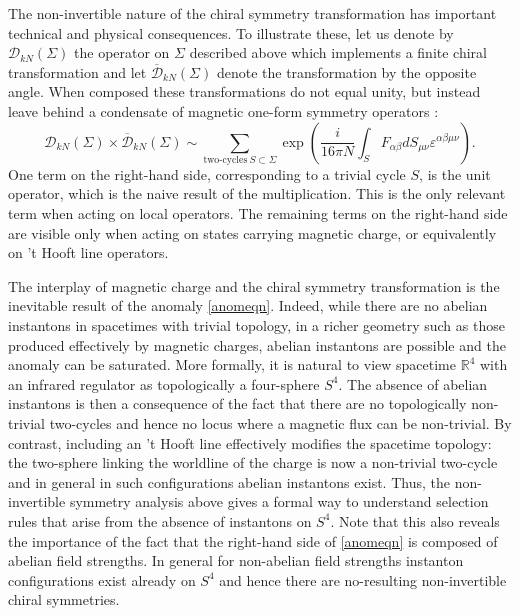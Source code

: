 \documentclass[11pt,a4paper]{article}
\begin{document}
The non-invertible nature of the chiral symmetry transformation has important technical and physical consequences.  To illustrate these, let us denote by $\mathcal{D}_{kN}(\Sigma)$ the operator on $\Sigma$ described above which implements a finite chiral transformation and let $\overline{\mathcal{D}}_{kN}(\Sigma)$ denote the transformation by the opposite angle.  When composed these transformations do not equal unity, but instead leave behind a condensate of magnetic one-form symmetry operators \cite{Choi:2021kmx, Kaidi:2021xfk,Roumpedakis:2022aik,Choi:2022jqy, Cordova:2022ieu}:
\begin{equation}\label{fusion}
    \mathcal{D}_{kN}(\Sigma)\times \overline{\mathcal{D}}_{kN}(\Sigma) \sim \sum_{\text{two-cycles}~ S\subset \Sigma}\exp\left(\frac{ i}{16\pi N}\int_{S}F_{\alpha \beta}dS_{\mu\nu}\varepsilon^{\alpha\beta \mu\nu}\right).
\end{equation}
One term on the right-hand side, corresponding to a trivial cycle $S$, is the unit operator, which is the naive result of the multiplication.  This is the only relevant term when acting on local operators.  The remaining terms on the right-hand side are visible only when acting on states carrying magnetic charge, or equivalently on 't Hooft line operators. 

The interplay of magnetic charge and the chiral symmetry transformation is the inevitable result of the anomaly \eqref{anomeqn}.  Indeed, while there are no abelian instantons in spacetimes with trivial topology, in a richer geometry such as those produced effectively by magnetic charges, abelian instantons are possible and the anomaly can be saturated.  More formally, it is natural to view spacetime $\mathbb{R}^{4}$ with an infrared regulator as topologically a four-sphere $S^{4}$.  The absence of abelian instantons is then a consequence of the fact that there are no topologically non-trivial two-cycles and hence no locus where a magnetic flux can be non-trivial.  By contrast, including an 't Hooft line effectively modifies the spacetime topology: the two-sphere linking the worldline of the charge is now a non-trivial two-cycle and in general in such configurations abelian instantons exist.  Thus, the non-invertible symmetry analysis above gives a formal way to understand selection rules that arise from the absence of instantons on $S^{4}$.  Note that this also reveals the importance of the fact that the right-hand side of \eqref{anomeqn} is composed of abelian field strengths.  In general for non-abelian field strengths instanton configurations exist already on $S^{4}$ and hence there are no-resulting non-invertible chiral symmetries. 
\end{document}
